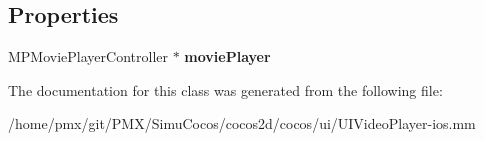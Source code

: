 \subsection*{Properties}
\begin{DoxyCompactItemize}
\item 
\mbox{\label{interfaceUIVideoViewWrapperIos_ad1cdc4dbfbd661f3c4987e0dbaacf8af}} 
M\+P\+Movie\+Player\+Controller $\ast$ {\bfseries movie\+Player}
\end{DoxyCompactItemize}


The documentation for this class was generated from the following file\+:\begin{DoxyCompactItemize}
\item 
/home/pmx/git/\+P\+M\+X/\+Simu\+Cocos/cocos2d/cocos/ui/U\+I\+Video\+Player-\/ios.\+mm\end{DoxyCompactItemize}

